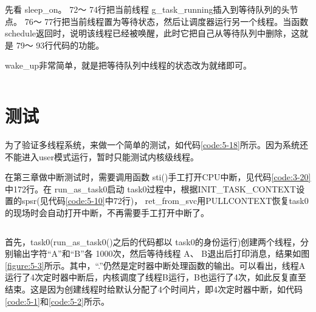 \documentclass[main.tex]{subfiles}
\begin{document}
\begin{CJK*}{UTF8}{song}
先看 sleep\_\-on。 72～ 74行把当前线程 g\_\-task\_\-running插入到等待队列的头节点。 76～ 77行把当前线程置为等待状态，然后让调度器运行另一个线程。当函数 schedule返回时，说明该线程已经被唤醒，此时它把自己从等待队列中删除，这就是 79～ 93行代码的功能。

\par
 wake\_\-up非常简单，就是把等待队列中线程的状态改为就绪即可。
 
\begin{code}
\label{code:5-17}
\inputminted[firstline=63,lastline=108,linenos,numbersep=5pt,frame=lines,framesep=2mm]{c}{src/chapter05/kernel/task.c}
\end{code}

\section{测试}
为了验证多线程系统，来做一个简单的测试，如代码\ref{code:5-18}所示。因为系统还不能进入user模式运行，暂时只能测试内核级线程。

\par
在第三章做中断测试时，需要调用函数 sti()手工打开CPU中断，见代码\ref{code:3-20}中172行。在 run\_\-as\_\-task0启动 task0过程中，根据INIT\_\-TASK\_\-CONTEXT设置的spsr(见代码\ref{code:5-10}中72行)， ret\_\-from\_\-svc用PULL\-CONTEXT恢复task0的现场时会自动打开中断，不再需要手工打开中断了。

\begin{code}
\label{code:5-18}
\inputminted[firstline=501,lastline=537,linenos,numbersep=5pt,frame=lines,framesep=2mm]{c}{src/chapter05/kernel/machdep.c}
\end{code}

首先，task0(run\_\-as\_\-task0()之后的代码都以 task0的身份运行)创建两个线程，分别输出字符“A”和“B”各 1000次，然后等待线程 A、 B退出后打印消息，结果如图\ref{figure:5-3}所示。其中，“.”仍然是定时器中断处理函数的输出。可以看出，线程A运行了4次定时器中断后，内核调度了线程B运行，B也运行了4次，如此反复直至结束。这是因为创建线程时给默认分配了4个时间片，即4次定时器中断，如代码\ref{code:5-1}和\ref{code:5-2}所示。


\end{CJK*}
\end{document}
